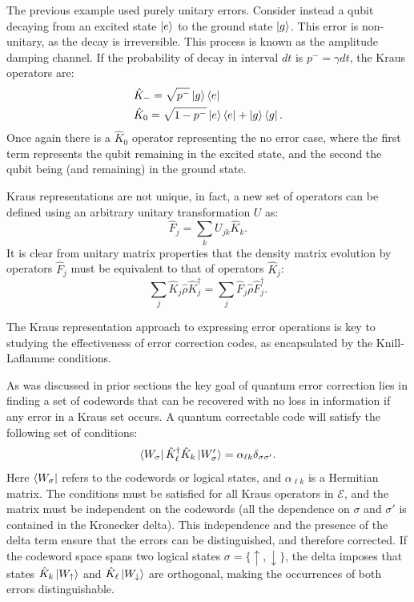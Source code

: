 The previous example used purely unitary errors. Consider instead a qubit decaying from an excited state $\ket{e}$ to the ground state $\ket{g}$. This error is non-unitary, as the decay is irreversible. This process is known as the amplitude damping channel. If the probability of decay in interval $dt$ is $p^-=\gamma dt$, the Kraus operators are:
\begin{eqnarray}
    &\hat K_- = \sqrt{p^-} \ket{g}\bra{e}\\
     &\hat K_0= \sqrt{1-p^-} \ket{e}\bra{e}+\ket{g}\bra{g}.
\end{eqnarray}
Once again there is a $\hat K_0$ operator representing the no error case, where the first term represents the qubit remaining in the excited state, and the second the qubit being (and remaining) in the ground state.

Kraus representations are not unique, in fact, a new set of operators can be defined using an arbitrary unitary transformation $U$ as:
\begin{equation}
    \hat F_j = \sum_k U_{jk}\hat K_k.
\end{equation}
It is clear from unitary matrix properties that the density matrix evolution by operators $\hat F_j$ must be equivalent to that of operators $\hat K_j$:
\begin{equation}
    \sum_j\hat K_j\hat\rho\hat K_j^\dagger = \sum_j\hat F_j\hat\rho\hat F_j^\dagger.
\end{equation}

The Kraus representation approach to expressing error operations is key to studying the effectiveness of error correction codes, as encapsulated by the Knill-Laflamme conditions.

As was discussed in prior sections the key goal of quantum error correction lies in finding a set of codewords that can be recovered with no loss in information if any error in a Kraus set occurs. A quantum correctable code will satisfy the following set of conditions:
\begin{equation}
    \bra{W_\sigma}  \hat K_\ell^\dagger\hat K_k \ket{W_\sigma'}= \alpha_{\ell k}\delta_{\sigma\sigma'}.
\end{equation}
Here $\bra{W_\sigma}$ refers to the codewords or logical states, and $\alpha_{\ell k}$ is a Hermitian matrix. The conditions must be satisfied for all Kraus operators in $\mathcal{E}$, and the matrix must be independent on the codewords (all the dependence on $\sigma$ and $\sigma'$ is contained in the Kronecker delta). This independence and the presence of the delta term ensure that the errors can be distinguished, and therefore corrected. If the codeword space spans two logical states $\sigma=\{\uparrow,\downarrow\}$, the delta imposes that states $\hat K_k\ket{W_\uparrow}$ and $\hat K_\ell\ket{W_\downarrow}$ are orthogonal, making the occurrences of both errors distinguishable.

